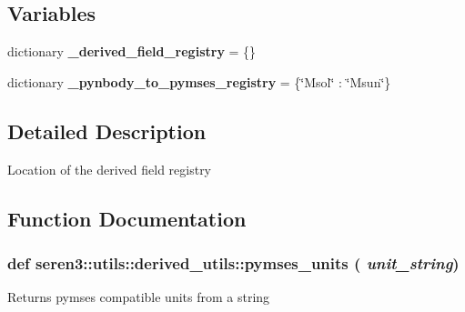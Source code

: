 \subsection*{Variables}
\begin{DoxyCompactItemize}
\item 
\hypertarget{namespaceseren3_1_1utils_1_1derived__utils_aba0d90356a8f88b348d3752143855e52}{
dictionary {\bfseries \_\-derived\_\-field\_\-registry} = \{\}}
\label{namespaceseren3_1_1utils_1_1derived__utils_aba0d90356a8f88b348d3752143855e52}

\item 
\hypertarget{namespaceseren3_1_1utils_1_1derived__utils_afa78500fbf1245539aa649086ba8a7cc}{
dictionary {\bfseries \_\-pynbody\_\-to\_\-pymses\_\-registry} = \{\char`\"{}Msol\char`\"{} : \char`\"{}Msun\char`\"{}\}}
\label{namespaceseren3_1_1utils_1_1derived__utils_afa78500fbf1245539aa649086ba8a7cc}

\end{DoxyCompactItemize}


\subsection{Detailed Description}
\begin{DoxyVerb}
Location of the derived field registry
\end{DoxyVerb}
 

\subsection{Function Documentation}
\hypertarget{namespaceseren3_1_1utils_1_1derived__utils_afede29ea170bbbc6746a11c1cd758242}{
\subsubsection[{pymses\_\-units}]{\setlength{\rightskip}{0pt plus 5cm}def seren3::utils::derived\_\-utils::pymses\_\-units ( {\em unit\_\-string})}}
\label{namespaceseren3_1_1utils_1_1derived__utils_afede29ea170bbbc6746a11c1cd758242}
\begin{DoxyVerb}
Returns pymses compatible units from a string
\end{DoxyVerb}
 
